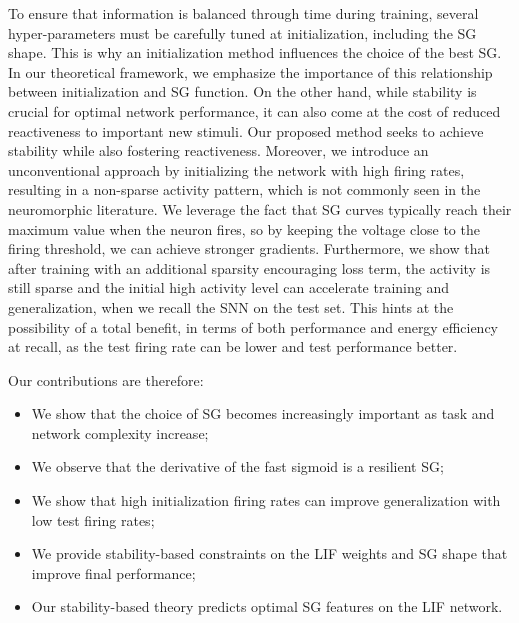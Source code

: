 To ensure that information is balanced through time during training, several hyper-parameters must be carefully tuned at initialization, including the SG shape. This is why an initialization method influences the choice of the best SG. In our theoretical framework, we emphasize the importance of this relationship between initialization and SG function. On the other hand, while stability is crucial for optimal network performance, it can also come at the cost of reduced reactiveness to important new stimuli. Our proposed method seeks to achieve stability while also fostering reactiveness. Moreover, we introduce an unconventional approach by initializing the network with high firing rates, resulting in a non-sparse activity pattern, which is not commonly seen in the neuromorphic literature. We leverage the fact that SG curves typically reach their maximum value when the neuron fires, so by keeping the voltage close to the firing threshold, we can achieve stronger gradients. Furthermore, we show that after training with an additional sparsity encouraging loss term, the activity is still sparse and the initial high activity level can accelerate training and generalization, when we recall the SNN on the test set. This hints at the possibility of a total benefit, in terms of both performance and energy efficiency at recall, as the test firing rate can be lower and test performance better.



Our contributions are therefore:
\begin{itemize}
    \item We show that the choice of SG becomes increasingly important as task and network complexity increase;
    \item We observe that the derivative of the fast sigmoid is a resilient SG;
    \item We show that high  initialization firing rates can improve generalization with low test firing rates;
    \item We provide stability-based constraints on the LIF weights and SG shape that improve final performance;
    \item Our stability-based theory predicts optimal SG features on the LIF network.
\end{itemize}
